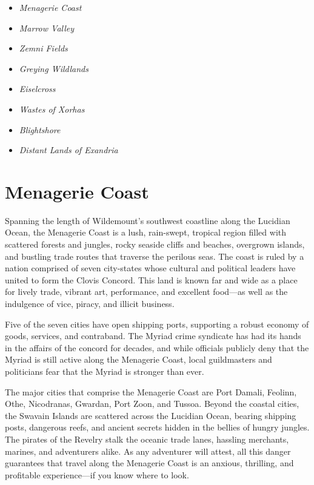\documentclass[10pt,a4paper,twoside,bg=print,twocolumn,openany,nodeprecatedcode]{dndbook}
\begin{document}
\begin{itemize}
\item \textit{Menagerie Coast}
\item \textit{Marrow Valley}
\item \textit{Zemni Fields}
\item \textit{Greying Wildlands}
\item \textit{Eiselcross}
\item \textit{Wastes of Xorhas}
\item \textit{Blightshore}
\item \textit{Distant Lands of Exandria}
\end{itemize}

\section{Menagerie Coast}
Spanning the length of Wildemount's southwest coastline along the Lucidian Ocean, the Menagerie Coast is a lush, rain-swept, tropical region filled with scattered forests and jungles, rocky seaside cliffs and beaches, overgrown islands, and bustling trade routes that traverse the perilous seas. The coast is ruled by a nation comprised of seven city-states whose cultural and political leaders have united to form the Clovis Concord. This land is known far and wide as a place for lively trade, vibrant art, performance, and excellent food—as well as the indulgence of vice, piracy, and illicit business.

Five of the seven cities have open shipping ports, supporting a robust economy of goods, services, and contraband. The Myriad crime syndicate has had its hands in the affairs of the concord for decades, and while officials publicly deny that the Myriad is still active along the Menagerie Coast, local guildmasters and politicians fear that the Myriad is stronger than ever.

The major cities that comprise the Menagerie Coast are Port Damali, Feolinn, Othe, Nicodranas, Gwardan, Port Zoon, and Tussoa. Beyond the coastal cities, the Swavain Islands are scattered across the Lucidian Ocean, bearing shipping posts, dangerous reefs, and ancient secrets hidden in the bellies of hungry jungles. The pirates of the Revelry stalk the oceanic trade lanes, hassling merchants, marines, and adventurers alike. As any adventurer will attest, all this danger guarantees that travel along the Menagerie Coast is an anxious, thrilling, and profitable experience—if you know where to look.
\end{document}
